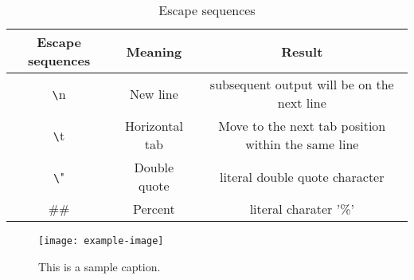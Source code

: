\documentclass[12pt]{article} %
\begin{document}
\begin{table}[h]
    \centering
    \begin{tabular}{|c|c|c|}
    \hline
    Escape sequences & Meaning & Result \\ \hline
    \texttt{\textbackslash}n & New line & subsequent output will be on the next line \\ \hline
    \texttt{\textbackslash}t & Horizontal tab & Move to the next tab position within the same line \\ \hline
    \texttt{\textbackslash}" & Double quote & literal double quote character \\ \hline
    \#\# & Percent & literal charater '\%' \\ \hline

    \end{tabular}
    \caption{Escape sequences}
\end{table}

    


\begin{figure}[h]
    \centering
    \texttt{[image: example-image]} %
    \caption{This is a sample caption.}
    \label{fig:example}
\end{figure}
\end{document}
